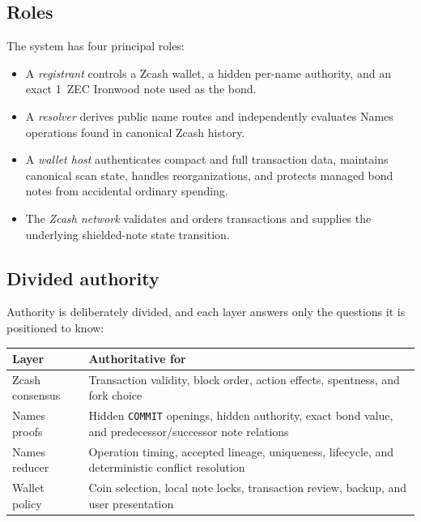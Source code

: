 \documentclass[11pt]{article}
\newcommand{\operation}[1]{\texttt{#1}}
\begin{document}
\subsection{Roles}

The system has four principal roles:

\begin{itemize}
\item A \emph{registrant} controls a Zcash wallet, a hidden per-name
authority, and an exact 1~ZEC Ironwood note used as the bond.
\item A \emph{resolver} derives public name routes and independently
evaluates Names operations found in canonical Zcash history.
\item A \emph{wallet host} authenticates compact and full transaction data,
maintains canonical scan state, handles reorganizations, and protects managed
bond notes from accidental ordinary spending.
\item The \emph{Zcash network} validates and orders transactions and supplies
the underlying shielded-note state transition.
\end{itemize}

\subsection{Divided authority}

Authority is deliberately divided, and each layer answers only the questions
it is positioned to know:

\begin{center}
\small
\begin{tabular}{>{\raggedright\arraybackslash}p{}>{\raggedright\arraybackslash}p{}}
\toprule
Layer & Authoritative for \\
\midrule
Zcash consensus & Transaction validity, block order, action effects, spentness, and fork choice \\
Names proofs & Hidden \operation{COMMIT} openings, hidden authority, exact bond value, and predecessor/successor note relations \\
Names reducer & Operation timing, accepted lineage, uniqueness, lifecycle, and deterministic conflict resolution \\
Wallet policy & Coin selection, local note locks, transaction review, backup, and user presentation \\
\bottomrule
\end{tabular}
\end{center}
\end{document}
